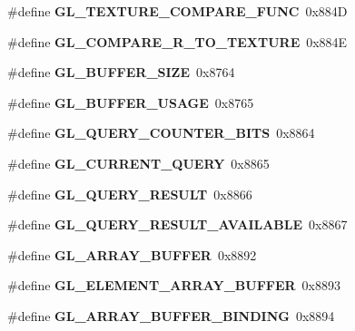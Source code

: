 \begin{DoxyCompactItemize}
\item 
\#define {\bfseries G\+L\+\_\+\+T\+E\+X\+T\+U\+R\+E\+\_\+\+C\+O\+M\+P\+A\+R\+E\+\_\+\+F\+U\+N\+C}~0x884\+D\label{_s_d_l__opengl_8h_a06b8fecef765b110cff1a8aa1adbd794}

\item 
\#define {\bfseries G\+L\+\_\+\+C\+O\+M\+P\+A\+R\+E\+\_\+\+R\+\_\+\+T\+O\+\_\+\+T\+E\+X\+T\+U\+R\+E}~0x884\+E\label{_s_d_l__opengl_8h_a1dc7d6e1f3357d3b9e686b800d2d4ae4}

\item 
\#define {\bfseries G\+L\+\_\+\+B\+U\+F\+F\+E\+R\+\_\+\+S\+I\+Z\+E}~0x8764\label{_s_d_l__opengl_8h_a97c3f50440fbe7eb098cfeede90d1686}

\item 
\#define {\bfseries G\+L\+\_\+\+B\+U\+F\+F\+E\+R\+\_\+\+U\+S\+A\+G\+E}~0x8765\label{_s_d_l__opengl_8h_a3c6158f6c9440fe495d4e14c2dea95a3}

\item 
\#define {\bfseries G\+L\+\_\+\+Q\+U\+E\+R\+Y\+\_\+\+C\+O\+U\+N\+T\+E\+R\+\_\+\+B\+I\+T\+S}~0x8864\label{_s_d_l__opengl_8h_affc3fd3d326f4bc17ec3ae70f64e3f02}

\item 
\#define {\bfseries G\+L\+\_\+\+C\+U\+R\+R\+E\+N\+T\+\_\+\+Q\+U\+E\+R\+Y}~0x8865\label{_s_d_l__opengl_8h_a3a40361f1742ce1d96079817f5b02640}

\item 
\#define {\bfseries G\+L\+\_\+\+Q\+U\+E\+R\+Y\+\_\+\+R\+E\+S\+U\+L\+T}~0x8866\label{_s_d_l__opengl_8h_a5f22b4318913632dfd529bc7536fa1d6}

\item 
\#define {\bfseries G\+L\+\_\+\+Q\+U\+E\+R\+Y\+\_\+\+R\+E\+S\+U\+L\+T\+\_\+\+A\+V\+A\+I\+L\+A\+B\+L\+E}~0x8867\label{_s_d_l__opengl_8h_aa3b4655feeeed8b7e7e981c994af1731}

\item 
\#define {\bfseries G\+L\+\_\+\+A\+R\+R\+A\+Y\+\_\+\+B\+U\+F\+F\+E\+R}~0x8892\label{_s_d_l__opengl_8h_a7180045dcb52b22af2cd0366026bc3ed}

\item 
\#define {\bfseries G\+L\+\_\+\+E\+L\+E\+M\+E\+N\+T\+\_\+\+A\+R\+R\+A\+Y\+\_\+\+B\+U\+F\+F\+E\+R}~0x8893\label{_s_d_l__opengl_8h_ad26c63125c72cbf0347b589d51676e6a}

\item 
\#define {\bfseries G\+L\+\_\+\+A\+R\+R\+A\+Y\+\_\+\+B\+U\+F\+F\+E\+R\+\_\+\+B\+I\+N\+D\+I\+N\+G}~0x8894\label{_s_d_l__opengl_8h_a5ecd4619421b6ddb35898ec4d38a9815}


\end{DoxyCompactItemize}

